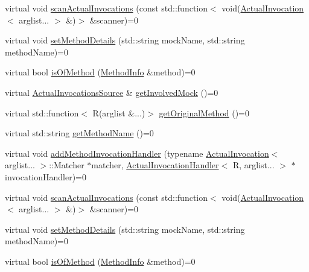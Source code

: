\begin{DoxyCompactItemize}
\item 
virtual void \mbox{\hyperlink{structfakeit_1_1MethodMockingContext_1_1Context_a89b30ea54bcf5e55c19696f77ad8423b}{scan\+Actual\+Invocations}} (const std\+::function$<$ void(\mbox{\hyperlink{structfakeit_1_1ActualInvocation}{Actual\+Invocation}}$<$ arglist... $>$ \&)$>$ \&scanner)=0
\item 
virtual void \mbox{\hyperlink{structfakeit_1_1MethodMockingContext_1_1Context_a9eb0cf6ed84ea4bd63333503bd6bdc1a}{set\+Method\+Details}} (std\+::string mock\+Name, std\+::string method\+Name)=0
\item 
virtual bool \mbox{\hyperlink{structfakeit_1_1MethodMockingContext_1_1Context_a126835068d4a7bcbf01f47080e690510}{is\+Of\+Method}} (\mbox{\hyperlink{structfakeit_1_1MethodInfo}{Method\+Info}} \&method)=0
\item 
virtual \mbox{\hyperlink{structfakeit_1_1ActualInvocationsSource}{Actual\+Invocations\+Source}} \& \mbox{\hyperlink{structfakeit_1_1MethodMockingContext_1_1Context_aab7f9487475b01f85e81b76cdf6c4860}{get\+Involved\+Mock}} ()=0
\item 
virtual std\+::function$<$ R(arglist \&...)$>$ \mbox{\hyperlink{structfakeit_1_1MethodMockingContext_1_1Context_a1878bb27937f4984d5c43e20c2b0b626}{get\+Original\+Method}} ()=0
\item 
virtual std\+::string \mbox{\hyperlink{structfakeit_1_1MethodMockingContext_1_1Context_ab5f7cc2c8d00214baacaad4c49ccf17f}{get\+Method\+Name}} ()=0
\item 
virtual void \mbox{\hyperlink{structfakeit_1_1MethodMockingContext_1_1Context_a87b3a2d95daf8aaa2ae56b49e032c275}{add\+Method\+Invocation\+Handler}} (typename \mbox{\hyperlink{structfakeit_1_1ActualInvocation}{Actual\+Invocation}}$<$ arglist... $>$\+::Matcher $\ast$matcher, \mbox{\hyperlink{structfakeit_1_1ActualInvocationHandler}{Actual\+Invocation\+Handler}}$<$ R, arglist... $>$ $\ast$invocation\+Handler)=0
\item 
virtual void \mbox{\hyperlink{structfakeit_1_1MethodMockingContext_1_1Context_a89b30ea54bcf5e55c19696f77ad8423b}{scan\+Actual\+Invocations}} (const std\+::function$<$ void(\mbox{\hyperlink{structfakeit_1_1ActualInvocation}{Actual\+Invocation}}$<$ arglist... $>$ \&)$>$ \&scanner)=0
\item 
virtual void \mbox{\hyperlink{structfakeit_1_1MethodMockingContext_1_1Context_a9eb0cf6ed84ea4bd63333503bd6bdc1a}{set\+Method\+Details}} (std\+::string mock\+Name, std\+::string method\+Name)=0
\item 
virtual bool \mbox{\hyperlink{structfakeit_1_1MethodMockingContext_1_1Context_a126835068d4a7bcbf01f47080e690510}{is\+Of\+Method}} (\mbox{\hyperlink{structfakeit_1_1MethodInfo}{Method\+Info}} \&method)=0

\end{DoxyCompactItemize}
